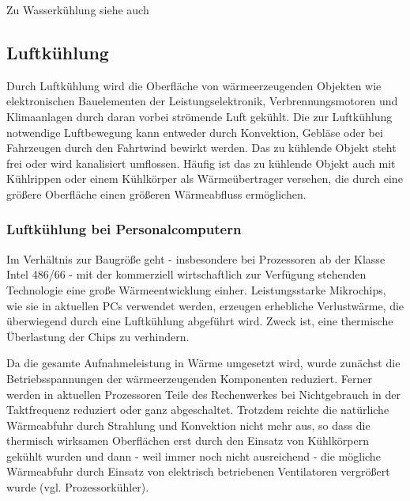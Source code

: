 Zu Wasserkühlung siehe auch \cite{Wasserkuehlung}

\newpage

\subsection{Luftkühlung} 

Durch Luftkühlung wird die Oberfläche von wärmeerzeugenden Objekten wie elektronischen Bauelementen der Leistungselektronik, Verbrennungsmotoren und Klimaanlagen durch daran vorbei strömende Luft gekühlt.
Die zur Luftkühlung notwendige Luftbewegung kann entweder durch Konvektion, Gebläse oder bei Fahrzeugen durch den Fahrtwind bewirkt werden. Das zu kühlende Objekt steht frei oder wird kanalisiert umflossen. Häufig ist das zu kühlende Objekt auch mit Kühlrippen oder einem Kühlkörper als Wärmeübertrager versehen, die durch eine größere Oberfläche einen größeren Wärmeabfluss ermöglichen.

\subsubsection{Luftkühlung bei Personalcomputern}

Im Verhältnis zur Baugröße geht - insbesondere bei Prozessoren ab der Klasse Intel 486/66 - mit der kommerziell wirtschaftlich zur Verfügung stehenden Technologie eine große Wärmeentwicklung einher. Leistungsstarke Mikrochips, wie sie in aktuellen PCs verwendet werden, erzeugen erhebliche Verlustwärme, die überwiegend durch eine Luftkühlung abgeführt wird. Zweck ist, eine thermische Überlastung der Chips zu verhindern.

Da die gesamte Aufnahmeleistung in Wärme umgesetzt wird, wurde zunächst die Betriebsspannungen der wärmeerzeugenden Komponenten reduziert. Ferner werden in aktuellen Prozessoren Teile des Rechenwerkes bei Nichtgebrauch in der Taktfrequenz reduziert oder ganz abgeschaltet. Trotzdem reichte die natürliche Wärmeabfuhr durch Strahlung und Konvektion nicht mehr aus, so dass die thermisch wirksamen Oberflächen erst durch den Einsatz von Kühlkörpern gekühlt wurden und dann - weil immer noch nicht ausreichend - die mögliche Wärmeabfuhr durch Einsatz von elektrisch betriebenen Ventilatoren vergrößert wurde (vgl. Prozessorkühler). 

